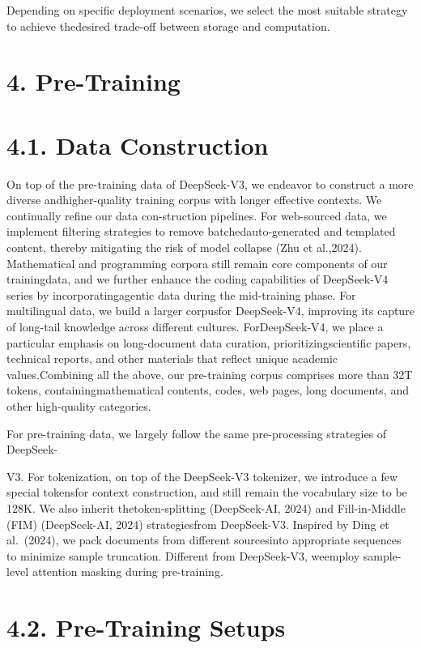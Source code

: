 \documentclass[
  10
]{article}
\begin{document}
Depending on specific deployment scenarios, we select the most suitable
strategy to achieve thedesired trade-off between storage and
computation.

\section{4. Pre-Training}\label{pre-training}

\section{4.1. Data Construction}\label{data-construction}

On top of the pre-training data of DeepSeek-V3, we endeavor to construct
a more diverse andhigher-quality training corpus with longer effective
contexts. We continually refine our data con-struction pipelines. For
web-sourced data, we implement filtering strategies to remove
batchedauto-generated and templated content, thereby mitigating the risk
of model collapse (Zhu et al.,2024). Mathematical and programming
corpora still remain core components of our trainingdata, and we further
enhance the coding capabilities of DeepSeek-V4 series by
incorporatingagentic data during the mid-training phase. For
multilingual data, we build a larger corpusfor DeepSeek-V4, improving
its capture of long-tail knowledge across different cultures.
ForDeepSeek-V4, we place a particular emphasis on long-document data
curation, prioritizingscientific papers, technical reports, and other
materials that reflect unique academic values.Combining all the above,
our pre-training corpus comprises more than 32T tokens,
containingmathematical contents, codes, web pages, long documents, and
other high-quality categories.

For pre-training data, we largely follow the same pre-processing
strategies of DeepSeek-

V3. For tokenization, on top of the DeepSeek-V3 tokenizer, we introduce
a few special tokensfor context construction, and still remain the
vocabulary size to be 128K. We also inherit thetoken-splitting
(DeepSeek-AI, 2024) and Fill-in-Middle (FIM) (DeepSeek-AI, 2024)
strategiesfrom DeepSeek-V3. Inspired by Ding et al.~(2024), we pack
documents from different sourcesinto appropriate sequences to minimize
sample truncation. Different from DeepSeek-V3, weemploy sample-level
attention masking during pre-training.

\section{4.2. Pre-Training Setups}\label{pre-training-setups}
\end{document}
